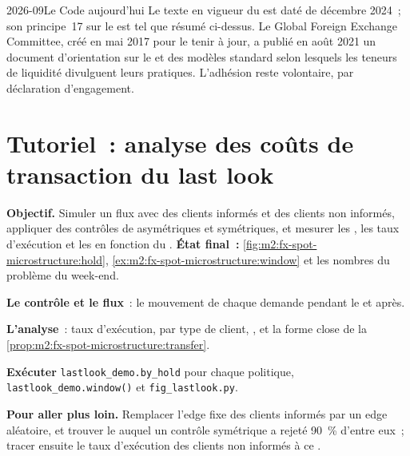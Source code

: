 \begin{dated}{2026-09}{Le Code aujourd'hui}\label{dat:m2:fx-spot-microstructure:code}
Le texte en vigueur du  est daté de décembre 2024~; son principe~17 sur
le  est tel que résumé ci-dessus. Le Global Foreign Exchange Committee, créé
en mai 2017 pour le tenir à jour, a publié en août 2021 un document d'orientation sur le
 et des modèles standard selon lesquels les teneurs de liquidité divulguent leurs
pratiques. L'adhésion reste volontaire, par déclaration d'engagement.
\end{dated}

\section{Tutoriel~: analyse des coûts de transaction du last look}\label{tut:m2:fx-spot-microstructure:tca}

\begin{tutorial}
\textbf{Objectif.} Simuler un flux avec des clients informés et des clients non informés, appliquer
des contrôles de  asymétriques et symétriques, et mesurer les , les taux d'exécution
et les  en fonction du . \textbf{État final~:}
\cref{fig:m2:fx-spot-microstructure:hold}, \cref{ex:m2:fx-spot-microstructure:window}
et les nombres du problème du week-end.
\begin{tutsteps}
\item \textbf{Le contrôle et le flux}~: le mouvement de chaque demande pendant
le  et après.
\label{lst:m2:fx-spot-microstructure:sim}
\item \textbf{L'analyse}~: taux d'exécution,  par type de client, ,
et la forme close de la \cref{prop:m2:fx-spot-microstructure:transfer}.
\label{lst:m2:fx-spot-microstructure:tca}
\item \textbf{Exécuter} \texttt{lastlook\_demo.by\_hold} pour chaque politique,
\texttt{lastlook\_demo.window()} et \texttt{fig\_lastlook.py}.
\end{tutsteps}
\textbf{Pour aller plus loin.} Remplacer l'edge fixe des clients informés par un
edge aléatoire, et trouver le  auquel un contrôle symétrique a rejeté
90~\% d'entre eux~; tracer ensuite le taux d'exécution des clients non informés à ce .
\end{tutorial}

